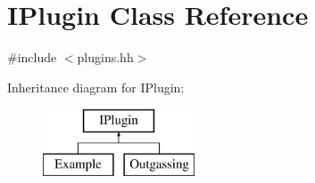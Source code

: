 \hypertarget{classIPlugin}{}\section{I\+Plugin Class Reference}
\label{classIPlugin}


{\ttfamily \#include $<$plugins.\+hh$>$}

Inheritance diagram for I\+Plugin\+:\begin{figure}[H]
\begin{center}
\leavevmode
\includegraphics[height=2.000000cm]{classIPlugin}
\end{center}
\end{figure}
